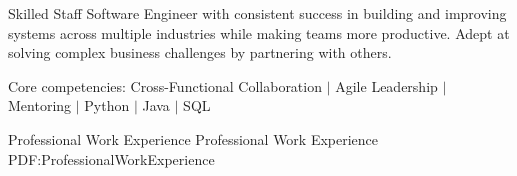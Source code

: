 \documentclass[MMMMyyyy,nonstopmode]{simpleresumecv_stacked}
\newcommand{\comment}[1]{\ignorespaces} %
\begin{document}
\begin{Body}

\item




\begin{center}
Skilled Staff Software Engineer with consistent success in building and improving systems across multiple industries while making teams more productive.
Adept at solving complex business challenges by partnering with others.

\BigGap
Core competencies:
Cross-Functional Collaboration $|$ \comment{System Design $|$ } \comment{Linux $|$} Agile Leadership $|$ Mentoring $|$ Python $|$ Java $|$ SQL 
\end{center}



\Section
{Professional Work Experience}
{Professional Work Experience}
{PDF:ProfessionalWorkExperience}


\end{Body}
\end{document}
